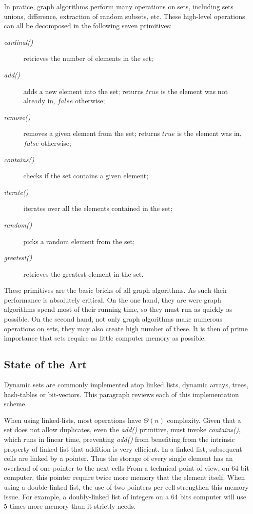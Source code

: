 \documentclass{article}
\newcommand{\complexityvalue}[1]{$\Theta(#1)$}
\newcommand{\prmtv}[1]{\textit{#1()}}
\begin{document}
In pratice, graph algorithms perform many operations on sets, including sets
unions, difference, extraction of random subsets, etc. These high-level operations can all be decomposed in the following seven primitives:
\begin{description}
\item[\prmtv{cardinal}] retrieves  the number of elements in the set;
\item[\prmtv{add}] adds a new element into the set; returns $true$ is the element was not already in, $false$ otherwise;
\item[\prmtv{remove}] removes a given element from the set; returns $true$ is the element was in, $false$ otherwise;
\item[\prmtv{contains}] checks if the set contains a given element;
\item[\prmtv{iterate}] iterates over all the elements contained in the set;
\item[\prmtv{random}] picks a random element from the set;
\item[\prmtv{greatest}] retrieves the greatest element in the set.
\end{description}
These primitives are the basic bricks of all graph algorithms. As such their
performance is absolutely critical. On the one hand, they are
were graph algorithms spend most of their running time, so they must
run as quickly as possible. On the second hand, not only graph algorithms make
numerous operations on sets, they may also create
high number of these. It is then of prime importance that sets require
as little computer memory as possible.


\subsection{State of the Art}
\label{sota}




Dynamic sets are commonly implemented atop linked lists, dynamic arrays, trees, hash-tables or bit-vectors.
This paragraph  reviews each of this implementation scheme.

When using linked-lists, most operations have  \complexityvalue{n} complexity.
Given that a set does not allow duplicates, even the \prmtv{add} primitive, must invoke \prmtv{contains}, 
which runs in linear time, preventing   \prmtv{add} from benefiting from the
intrinsic property of linked-list that addition is very efficient.
In a  linked list, subsequent cells are linked by a pointer.
Thus the storage of every single element has an overhead of one pointer to the next cells From a technical point of view,
on 64 bit computer, this pointer require twice more memory that the element itself. When using a double-linked list,
the use of two pointers per cell strengthen this memory issue. For example, a doubly-linked list of integers on a
64 bits computer will use 5 times more memory than it strictly needs.
\end{document}
